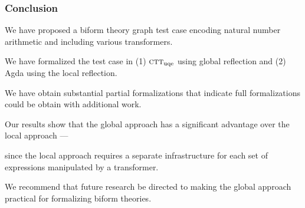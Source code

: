 \documentclass[t,12pt,numbers,fleqn]{beamer}
\newcommand{\churchuqe}{$\mbox{\sc ctt}_{\rm uqe}$}
\begin{document}
\begin{frame}
\frametitle{Conclusion}
\bi

  \item We have proposed a biform theory graph test case encoding
    natural number arithmetic and including various transformers.

\pause

  \item We have formalized the test case in (1) {\churchuqe} using 
    global reflection and (2) Agda using the local reflection.

  \bi

    \item We have obtain substantial partial formalizations that
      indicate full formalizations could be obtain with additional
      work.

  \ei

\pause

  \item Our results show that the global approach has a significant
    advantage over the local approach ---

  \bi

    \item[] since the local approach requires a separate
      infrastructure for each set of expressions manipulated by a
      transformer.
 
  \ei

\pause

  \item We recommend that future research be directed to making the
    global approach practical for formalizing biform theories.

\ei
\end{frame}

\end{document}
